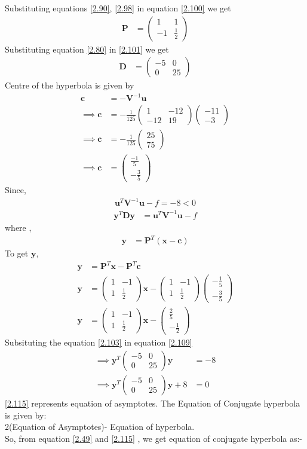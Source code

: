 \documentclass[journal,12pt,twocolumn]{IEEEtran}
\let\vec\mathbf
\numberwithin{equation}{subsection}
\newcommand{\myvec}[1]{\ensuremath{\begin{pmatrix}#1\end{pmatrix}}}
\begin{document}
Substituting equations \ref{2.90}, \ref{2.98} in equation \ref{2.100} we get 
\begin{align}
    \vec{P}&=\myvec{1 & 1 \\-1 & \frac{1}{2}}\label{2.102}
\end{align}
Substituting equation \ref{2.80} in \ref{2.101} we get
\begin{align}
       \vec{D}&=\myvec{-5 & 0\\0 & 25}\label{2.103}
\end{align}
Centre of the hyperbola is given by 
\begin{align}
    \vec{c}&=-\vec{V}^{-1}\vec{u}\\
    \implies\vec{c}&=-\frac{1}{125}\myvec{1&-12\\-12&19}\myvec{-11 \\ -3}\\
    \implies\vec{c}&=-\frac{1}{125}\myvec{25\\ 75}\\
    \implies\vec{c}&=\myvec{\frac{-1}{5}\\-\frac{3}{5}}
\end{align}
Since,
\begin{align}
    \vec{u}^T\vec{V}^{-1}\vec{u}-f = -8 < 0\label{2.108}
\end{align}
\begin{align}
    \vec{y}^T\vec{D}\vec{y}&=\vec{u}^T\vec{V}^{-1}\vec{u}-f \label{2.109}
\end{align}
where ,
\begin{align}
    \vec{y}&=\vec{P}^T(\vec{x}-\vec{c})
\end{align}
To get $\vec{y}$,
\begin{align}
\vec{y}&=\vec{P}^T\vec{x}-\vec{P}^T\vec{c}\\
    \vec{y}&= \myvec{1 & -1 \\ 1 & \frac{1}{2}}\vec{x}-\myvec{1 & -1 \\ 1 & \frac{1}{2}}\myvec{-\frac{1}{5}\\-\frac{3}{5}}\\
    \vec{y}&=\myvec{1 & -1 \\ 1 & \frac{1}{2}}\vec{x}-\myvec{\frac{2}{5}\\ -\frac{1}{2}}
\end{align}
Subsituting the equation \ref{2.103} in equation \ref{2.109}
\begin{align}
   \implies\vec{y}^T\myvec{-5 & 0 \\0 & 25}\vec{y}&= -8\\
   \implies\vec{y}^T\myvec{-5 & 0 \\0 & 25}\vec{y} + 8&= 0 \label{2.115}
\end{align} 
\ref{2.115} represents equation of asymptotes. The Equation of Conjugate hyperbola is given by:\\
2(Equation of Asymptotes)- Equation of hyperbola. \\
So, from equation \ref{2.49} and \ref{2.115} , we get equation of conjugate hyperbola as:-
\end{document}
